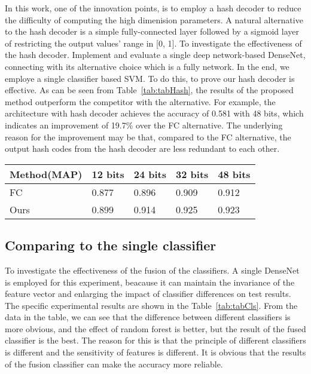 In this work, one of the innovation points, is to 
employ a hash decoder to reduce the difficulty
of computing the high dimenision parameters. A 
natural alternative to the hash decoder is
a simple fully-connected layer followed by 
a sigmoid layer of restricting the output 
values’ range in [0, 1]. To investigate the 
effectiveness of the hash decoder. Implement 
and evaluate a single deep network-based
DenseNet, connecting with its alternative
choice which is a fully network. In the end,
we employe a single classifier based SVM. To
do this, to prove our hash decoder is 
effective. As can be seen from 
Table~\ref{tab:tabHash}, 
the results of the proposed method outperform 
the competitor with the alternative. For 
example, the architecture with hash decoder 
achieves the accuracy of 0.581 with 48 bits, which 
indicates an improvement of 19.7$\%$ over the 
FC alternative. The underlying reason for
the improvement may be that, compared to the 
FC alternative, the output hash codes from 
the hash decoder are less redundant to each 
other.

\begin{table*}[!ht]
    \caption{Comparison results of the hash 
        decoder and fully connection}
    \label{tab:tabHash}
    \setlength{\arrayrulewidth}{1.05 pt}
    \renewcommand{\arraystretch}{1.1}
    \begin{tabular*}{1.0\textwidth}{
        @{
            \extracolsep{\fill}
        }lllll
    }
        \hline
        
        Method(MAP) & 12 bits & 24 bits & 32 bits & 48 bits \\
                
        \hline

        FC    & 0.877 & 0.896 & 0.909 & 0.912 \\       
        Ours  & 0.899 & 0.914 & 0.925 & 0.923 \\
        
        \hline
    \end{tabular*}
\end{table*}

\subsection{Comparing to the single classifier}
\label{ExpCls}

To investigate the effectiveness of the fusion
of the classifiers. A single DenseNet is employed
for this experiment, beacause it can maintain 
the invariance of the feature vector and enlarging 
the impact of classifier differences on test 
results. The specific 
experimental results are shown in the 
Table~\ref{tab:tabCls}. From the data in the 
table, we can see that the difference between 
different classifiers is more obvious, and 
the effect of random forest is better, but 
the result of the fused classifier is the best. 
The reason for this is that the principle of 
different classifiers is different and the 
sensitivity of features is different. It is 
obvious that the results of the fusion 
classifier can make the accuracy more reliable.

